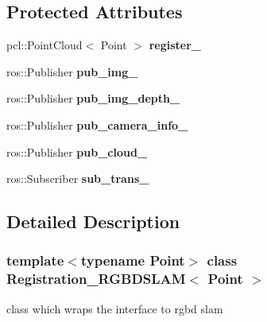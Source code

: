 \subsection*{Protected Attributes}
\begin{DoxyCompactItemize}
\item 
\hypertarget{classRegistration__RGBDSLAM_a32d5fe77a83e546080aaee1bcdead42f}{
pcl::PointCloud$<$ Point $>$ {\bfseries register\_\-}}
\label{classRegistration__RGBDSLAM_a32d5fe77a83e546080aaee1bcdead42f}

\item 
\hypertarget{classRegistration__RGBDSLAM_af83c679733a4eef87053200ec583fa72}{
ros::Publisher {\bfseries pub\_\-img\_\-}}
\label{classRegistration__RGBDSLAM_af83c679733a4eef87053200ec583fa72}

\item 
\hypertarget{classRegistration__RGBDSLAM_a163812fdfbaeb9b8db3f59c05ee00663}{
ros::Publisher {\bfseries pub\_\-img\_\-depth\_\-}}
\label{classRegistration__RGBDSLAM_a163812fdfbaeb9b8db3f59c05ee00663}

\item 
\hypertarget{classRegistration__RGBDSLAM_a31a5dc9b215fa9157cb890d84bf3cfbc}{
ros::Publisher {\bfseries pub\_\-camera\_\-info\_\-}}
\label{classRegistration__RGBDSLAM_a31a5dc9b215fa9157cb890d84bf3cfbc}

\item 
\hypertarget{classRegistration__RGBDSLAM_a0d2001a54b8013b602004a892cab4249}{
ros::Publisher {\bfseries pub\_\-cloud\_\-}}
\label{classRegistration__RGBDSLAM_a0d2001a54b8013b602004a892cab4249}

\item 
\hypertarget{classRegistration__RGBDSLAM_a0c92e217d23b31dfb1add3e652dba29a}{
ros::Subscriber {\bfseries sub\_\-trans\_\-}}
\label{classRegistration__RGBDSLAM_a0c92e217d23b31dfb1add3e652dba29a}

\end{DoxyCompactItemize}


\subsection{Detailed Description}
\subsubsection*{template$<$typename Point$>$ class Registration\_\-RGBDSLAM$<$ Point $>$}

class which wraps the interface to rgbd slam


